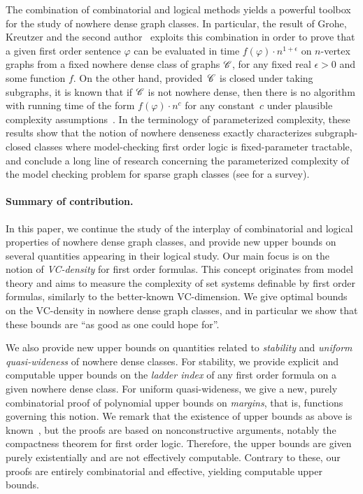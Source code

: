The combination of combinatorial and logical methods yields a powerful toolbox for the study
of nowhere dense graph classes. In particular, 
the result of Grohe, Kreutzer and the second author~\cite{grohe2014deciding} exploits 
this combination in order to prove that  a given
first order sentence $\varphi$ can be evaluated in time 
$f(\varphi)\cdot n^{1+\epsilon}$ on $n$-vertex graphs from a fixed nowhere dense class of graphs $\mathscr{C}$, for any fixed real $\epsilon>0$ and some function $f$.
On the other hand, provided~$\mathscr{C}$ is closed under taking subgraphs, it is known that if $\mathscr{C}$ is not nowhere dense,
then there is no algorithm with running time of the form $f(\varphi)\cdot n^c$ for any constant~$c$ under plausible complexity assumptions~\cite{dvovrak2013testing}.
In the terminology of parameterized complexity, these results show that the notion of nowhere denseness exactly characterizes subgraph-closed classes where model-checking first order logic
is fixed-parameter tractable, and conclude a long line of research concerning the parameterized complexity of the model checking problem for sparse graph classes (see \cite{grokre11} for a survey). 


\paragraph{Summary of contribution.} In this paper, we continue the study of the 
interplay of combinatorial and logical properties
of nowhere dense graph classes, and provide
new upper bounds on several
quantities appearing in their logical study.
Our main focus is on the notion of \emph{VC-density} for first order formulas. This concept originates from model theory and 
aims to measure the complexity of set systems definable by first order formulas, similarly to the better-known VC-dimension.
We give optimal bounds on the VC-density in nowhere dense graph classes, and in particular we show that these bounds are ``as good as one could hope for''.

We also provide new upper bounds on quantities related to {\em{stability}} and {\em{uniform quasi-wideness}} of nowhere dense classes.
For stability, we provide explicit and computable upper bounds on the \emph{ladder index} of any first order formula on a given nowhere dense class.
For uniform quasi-wideness, we give a new, purely combinatorial proof of polynomial upper bounds on {\em{margins}}, that is, functions governing this notion.
We remark that the existence of upper bounds as above is known~\cite{adler2014interpreting,siebertz2016polynomial}, but the proofs are based on nonconstructive arguments, 
notably the compactness theorem for first order logic. Therefore, the upper bounds are given purely existentially and are not effectively computable.
Contrary to these, our proofs are entirely combinatorial and effective, yielding computable upper bounds.

